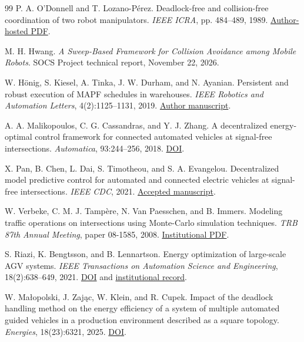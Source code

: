 \documentclass[11pt,a4paper]{article}
\begin{document}
\begin{thebibliography}{99}
P. A. O'Donnell and T. Lozano-P\'erez.
Deadlock-free and collision-free coordination of two robot manipulators.
\emph{IEEE ICRA}, pp. 484--489, 1989.
\href{https://lis.csail.mit.edu/pubs/tlp/coordination-o-donnell.pdf}{Author-hosted PDF}.

M. H. Hwang.
\emph{A Sweep-Based Framework for Collision Avoidance among Mobile Robots}.
SOCS Project technical report, November 22, 2026.

W. H\"onig, S. Kiesel, A. Tinka, J. W. Durham, and N. Ayanian.
Persistent and robust execution of MAPF schedules in warehouses.
\emph{IEEE Robotics and Automation Letters}, 4(2):1125--1131, 2019.
\href{https://whoenig.github.io/publications/2019_RA-L_Hoenig.pdf}{Author manuscript}.

A. A. Malikopoulos, C. G. Cassandras, and Y. J. Zhang.
A decentralized energy-optimal control framework for connected automated
vehicles at signal-free intersections.
\emph{Automatica}, 93:244--256, 2018.
\href{https://doi.org/10.1016/j.automatica.2018.03.056}{DOI}.

X. Pan, B. Chen, L. Dai, S. Timotheou, and S. A. Evangelou.
Decentralized model predictive control for automated and connected electric
vehicles at signal-free intersections. \emph{IEEE CDC}, 2021.
\href{https://discovery.ucl.ac.uk/id/eprint/10131957/}{Accepted manuscript}.

W. Verbeke, C. M. J. Tamp\`ere, N. Van Paesschen, and B. Immers.
Modeling traffic operations on intersections using Monte-Carlo simulation
techniques. \emph{TRB 87th Annual Meeting}, paper 08-1585, 2008.
\href{https://www.mech.kuleuven.be/cib/verkeer/dwn/pub/PC2008B.pdf}{Institutional PDF}.

S. Riazi, K. Bengtsson, and B. Lennartson.
Energy optimization of large-scale AGV systems.
\emph{IEEE Transactions on Automation Science and Engineering}, 18(2):638--649, 2021.
\href{https://doi.org/10.1109/TASE.2019.2963285}{DOI} and
\href{https://research.chalmers.se/en/publication/523467}{institutional record}.

W. Ma\l{}opolski, J. Zaj\k{a}c, W. Klein, and R. Cupek.
Impact of the deadlock handling method on the energy efficiency of a system
of multiple automated guided vehicles in a production environment described
as a square topology. \emph{Energies}, 18(23):6321, 2025.
\href{https://doi.org/10.3390/en18236321}{DOI}.


\end{thebibliography}
\end{document}
